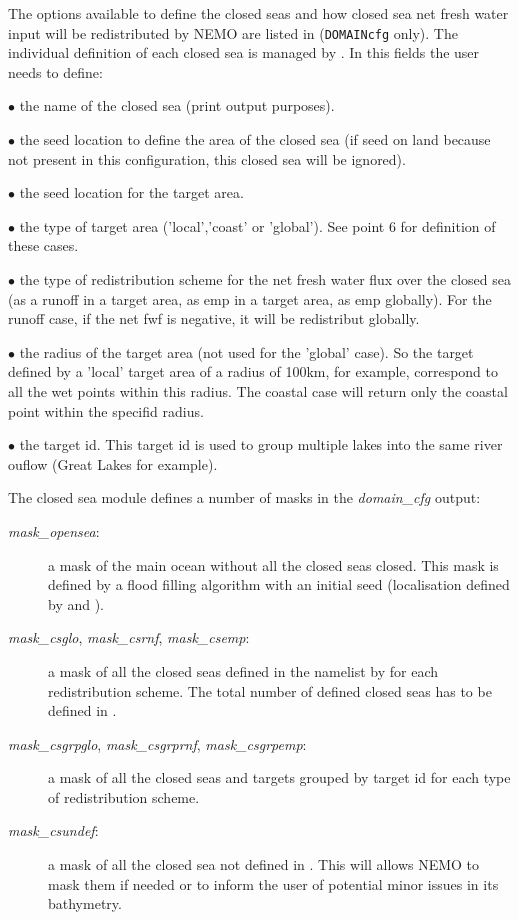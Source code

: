 \documentclass[../main/NEMO_manual]{subfiles}
\begin{document}
The options available to define the closed seas and how closed sea net fresh water input will be redistributed by NEMO are listed in  (\texttt{DOMAINcfg} only).
The individual definition of each closed sea is managed by . In this fields the user needs to define:\\
   \begin{description}
   \item $\bullet$    the name of the closed sea (print output purposes).
   \item $\bullet$    the seed location to define the area of the closed sea (if seed on land because not present in this configuration, this closed sea will be ignored).\\
   \item $\bullet$    the seed location for the target area.
   \item $\bullet$    the type of target area ('local','coast' or 'global'). See point 6 for definition of these cases.
   \item $\bullet$    the type of redistribution scheme for the net fresh water flux over the closed sea (as a runoff in a target area, as emp in a target area, as emp globally). For the runoff case, if the net fwf is negative, it will be redistribut globally.
   \item $\bullet$    the radius of the target area (not used for the 'global' case). So the target defined by a 'local' target area of a radius of 100km, for example, correspond to all the wet points within this radius. The coastal case will return only the coastal point within the specifid radius.
   \item $\bullet$    the target id. This target id is used to group multiple lakes into the same river ouflow (Great Lakes for example).
   \end{description}

The closed sea module defines a number of masks in the \textit{domain\_cfg} output:
   \begin{description}
   \item[\textit{mask\_opensea}:] a mask of the main ocean without all the closed seas closed. This mask is defined by a flood filling algorithm with an initial seed (localisation defined by  and ).
   \item[\textit{mask\_csglo}, \textit{mask\_csrnf}, \textit{mask\_csemp}:] a mask of all the closed seas defined in the namelist by  for each redistribution scheme. The total number of defined closed seas has to be defined in .
   \item[\textit{mask\_csgrpglo}, \textit{mask\_csgrprnf}, \textit{mask\_csgrpemp}:] a mask of all the closed seas and targets grouped by target id for each type of redistribution scheme.
   \item[\textit{mask\_csundef}:] a mask of all the closed sea not defined in . This will allows NEMO to mask them if needed or to inform the user of potential minor issues in its bathymetry.
   \end{description}
   
\subinc{}
\end{document}
